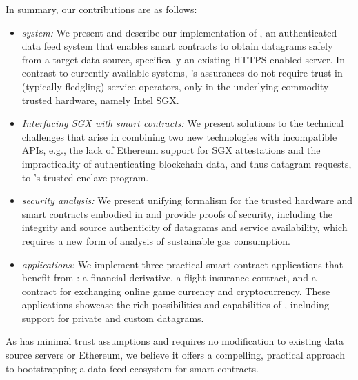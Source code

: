 In summary, our contributions are as follows:

\begin{itemize}

\item \emph{\tcs system:} We present and describe our implementation of \tc, an authenticated data feed system that enables smart contracts to obtain datagrams safely from a target data source, specifically an existing HTTPS-enabled server. In contrast to currently available systems, \tc's assurances do not require trust in (typically fledgling) service operators, only in the underlying commodity trusted hardware, namely Intel SGX. 

\item \emph{Interfacing SGX with smart contracts:} We present solutions to the technical challenges that arise in combining two new technologies with incompatible APIs, e.g., the lack of Ethereum support for SGX attestations and the impracticality of authenticating blockchain data, and thus datagram requests, to \tc's trusted enclave program. 

\item \emph{\tc security analysis:} We present unifying formalism for the trusted hardware and smart contracts embodied in \tc and provide proofs of security, including the integrity and source authenticity of datagrams and service availability, which requires a new form of analysis of sustainable gas consumption. 

\item \emph{\tc applications:} We implement three practical smart contract applications that benefit from \tc: a financial derivative, a flight insurance contract, and a contract for exchanging online game currency and cryptocurrency. These applications showcase the rich possibilities and capabilities of \tc, including support for private and custom datagrams. 

\end{itemize}

As \tc has minimal trust assumptions and requires no modification to existing data source servers or Ethereum, we believe it offers a compelling, practical approach to bootstrapping a data feed ecosystem for smart contracts.


